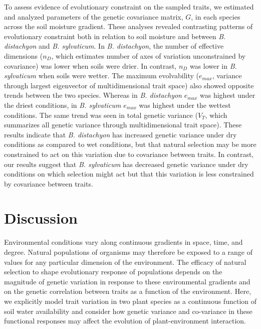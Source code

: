 \documentclass[jou,floatsintext]{apa6}
\begin{document}
To assess evidence of evolutionary constraint on the sampled traits, we estimated and analyzed parameters of the genetic covariance matrix, \(G\), in each species across the soil moisture gradient. These analyses revealed contrasting patterns of evolutionary constraint both in relation to soil moisture and between \emph{B. distachyon} and \emph{B. sylvaticum}. In \emph{B. distachyon}, the number of effective dimensions (\(n_D\), which estimates number of axes of variation unconstrained by covariance) was lower when soils were drier. In contrast, \(n_D\) was lower in \emph{B. sylvaticum} when soils were wetter. The maximum evolvability (\(e_{max}\), variance through largest eigenvector of multidimensional trait space) also showed opposite trends between the two species. Whereas in \emph{B. distachyon} \(e_{max}\) was highest under the driest conditions, in \emph{B. sylvaticum} \(e_{max}\) was highest under the wettest conditions. The same trend was seen in total genetic variance (\(V_T\), which summarizes all genetic variance through multidimensional trait space). These results indicate that \emph{B. distachyon} has increased genetic variance under dry conditions as compared to wet conditions, but that natural selection may be more constrained to act on this variation due to covariance between traits. In contrast, our results suggest that \emph{B. sylvaticum} has decreased genetic variance under dry conditions on which selection might act but that this variation is less constrained by covariance between traits.

\hypertarget{discussion}{%
\section{Discussion}\label{discussion}}

Environmental conditions vary along continuous gradients in space, time, and degree. Natural populations of organisms may therefore be exposed to a range of values for any particular dimension of the environment. The efficacy of natural selection to shape evolutionary response of populations depends on the magnitude of genetic variation in response to these environmental gradients and on the genetic correlation between traits as a function of the environment. Here, we explicitly model trait variation in two plant species as a continuous function of soil water availability and consider how genetic variance and co-variance in these functional responses may affect the evolution of plant-environment interaction.
\end{document}
